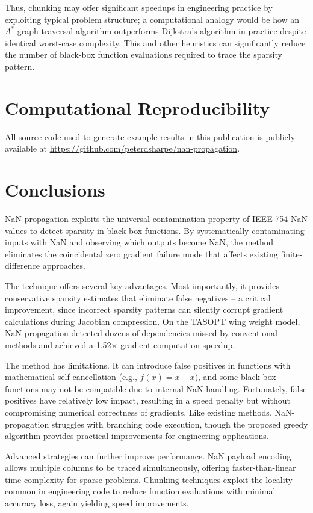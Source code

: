 \documentclass{article}
\begin{document}
Thus, chunking may offer significant speedups in engineering practice by exploiting typical problem structure; a computational analogy would be how an $A^*$ graph traversal algorithm outperforms Dijkstra's algorithm in practice despite identical worst-case complexity. This and other heuristics can significantly reduce the number of black-box function evaluations required to trace the sparsity pattern.

\section{Computational Reproducibility}
\label{sec:nan-reproducibility}

All source code used to generate example results in this publication is publicly available at \url{https://github.com/peterdsharpe/nan-propagation}.

\section{Conclusions}
\label{sec:conclusions}

NaN-propagation exploits the universal contamination property of IEEE 754 NaN values to detect sparsity in black-box functions. By systematically contaminating inputs with NaN and observing which outputs become NaN, the method eliminates the coincidental zero gradient failure mode that affects existing finite-difference approaches.

The technique offers several key advantages. Most importantly, it provides conservative sparsity estimates that eliminate false negatives -- a critical improvement, since incorrect sparsity patterns can silently corrupt gradient calculations during Jacobian compression. On the TASOPT wing weight model, NaN-propagation detected dozens of dependencies missed by conventional methods and achieved a 1.52× gradient computation speedup.

The method has limitations. It can introduce false positives in functions with mathematical self-cancellation (e.g., $f(x) = x - x$), and some black-box functions may not be compatible due to internal NaN handling. Fortunately, false positives have relatively low impact, resulting in a speed penalty but without compromising numerical correctness of gradients. Like existing methods, NaN-propagation struggles with branching code execution, though the proposed greedy algorithm provides practical improvements for engineering applications.

Advanced strategies can further improve performance. NaN payload encoding allows multiple columns to be traced simultaneously, offering faster-than-linear time complexity for sparse problems. Chunking techniques exploit the locality common in engineering code to reduce function evaluations with minimal accuracy loss, again yielding speed improvements.
\end{document}
